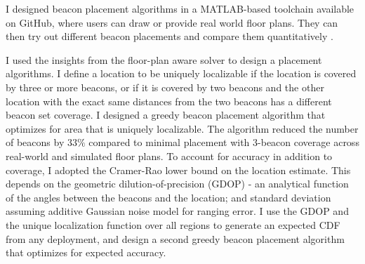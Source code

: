 \documentclass[10pt]{article}
\begin{document}
I designed beacon placement algorithms in a
MATLAB-based toolchain available on GitHub, where users can draw or provide real world floor plans. They can
then try out different beacon placements and compare them quantitatively \cite{rajagopal2016beacon}. 

I used the insights from the floor-plan aware solver to design a placement algorithms. %
I define a location to be uniquely localizable if the location is covered by three or more beacons, or if it is covered by two beacons and the other location with the exact same distances from the two beacons has a different beacon set coverage. I designed a greedy beacon placement algorithm that optimizes for area that is uniquely localizable.  The algorithm reduced the number of beacons by $33\%$ compared to minimal placement with 3-beacon coverage across real-world and simulated floor plans. %
To account for accuracy in addition to coverage, I adopted the Cramer-Rao lower bound on the location estimate. This depends on the geometric dilution-of-precision (GDOP) - an analytical function of the angles between the beacons and the location; and standard deviation assuming additive Gaussian noise model for ranging error. I use the GDOP and the unique localization function over all regions to generate an expected CDF from any deployment, and design a second greedy beacon placement algorithm that optimizes for expected accuracy.  %
\end{document}
